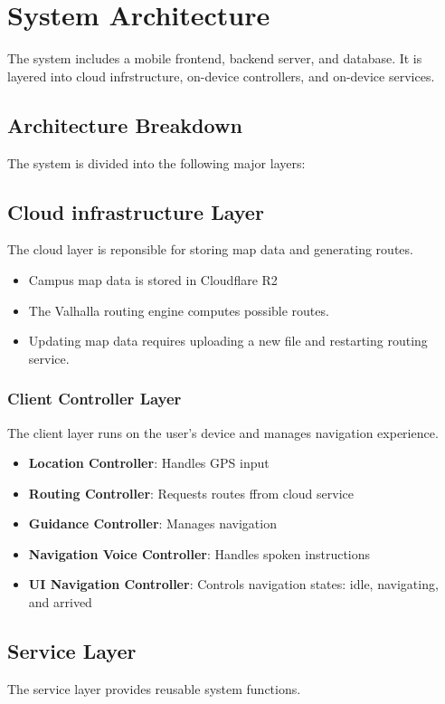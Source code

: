 \documentclass{article}
\begin{document}
\section{System Architecture}
The system includes a mobile frontend, backend server, and database. It is layered into cloud infrstructure, on-device controllers, and on-device services.

\subsection{Architecture Breakdown}
The system is divided into the following major layers: 

\subsection{Cloud infrastructure Layer}
The cloud layer is reponsible for storing map data and generating routes.

\begin{itemize}
	\item Campus map data is stored in Cloudflare R2
	\item The Valhalla routing engine computes possible routes.
	\item Updating map data requires uploading a new file and restarting routing service.
\end{itemize}

\subsubsection{Client Controller Layer}
The client layer runs on the user's device and manages navigation experience.
\begin{itemize}
	\item \textbf{Location Controller}: Handles GPS input
	\item \textbf{Routing Controller}: Requests routes ffrom cloud service
	\item \textbf{Guidance Controller}: Manages navigation
	\item \textbf{Navigation Voice Controller}: Handles spoken instructions
	\item \textbf{UI Navigation Controller}: Controls navigation states: idle, navigating, and arrived
\end{itemize}

\subsection{Service Layer}
The service layer provides reusable system functions.
\end{document}
